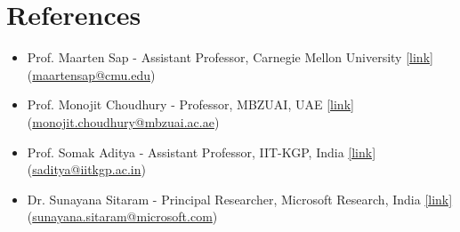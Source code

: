\documentclass[11pt,letterpaper]{article}
\begin{document}
    \section*{References}
    \begin{itemize}[leftmargin=*,label={},itemsep=4pt]
        \item Prof. Maarten Sap - Assistant
                Professor, Carnegie Mellon University  \href{https://maartensap.com}{[link]} (\href{mailto:maartensap@cmu.edu}{maartensap@cmu.edu})    \item Prof. Monojit
                Choudhury - Professor, MBZUAI, UAE  \href{https://mbzuai.ac.ae/study/faculty/monojit-choudhury/}{[link]} (\href{mailto:monojit.choudhury@mbzuai.ac.ae}{monojit.choudhury@mbzuai.ac.ae})    \item Prof. Somak Aditya - Assistant
                Professor, IIT-KGP, India  \href{https://adityasomak.github.io/}{[link]} (\href{mailto:saditya@iitkgp.ac.in}{saditya@iitkgp.ac.in})    \item Dr. Sunayana Sitaram
                - Principal Researcher, Microsoft Research, India  \href{https://www.microsoft.com/en-us/research/people/susitara/}{[link]} (\href{mailto:sunayana.sitaram@microsoft.com}{sunayana.sitaram@microsoft.com})\end{itemize}
    
    
\end{document}
